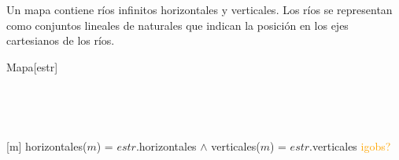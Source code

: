 \begin{Representacion}
  
  
    Un mapa contiene ríos infinitos horizontales y verticales. Los ríos se
    representan como conjuntos lineales de naturales que indican la posición en
    los ejes cartesianos de los ríos.
  
    \begin{Estructura}{Mapa}[estr]
      \begin{Tupla}[estr]
      \end{Tupla}
  
    \end{Estructura}
    
    ~ 

  
    ~ 
  
    [m]{
        horizontales($m$) = $estr$.horizontales $\land$ 
        verticales($m$) = $estr$.verticales \textcolor{orange}{igobs?}
    }
  
  \end{Representacion}